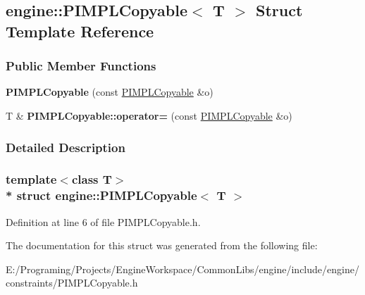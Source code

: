 \hypertarget{a00060}{}\subsection{engine\+:\+:P\+I\+M\+P\+L\+Copyable$<$ T $>$ Struct Template Reference}
\label{a00060}
\subsubsection*{Public Member Functions}
\begin{DoxyCompactItemize}
\item 
{\bfseries P\+I\+M\+P\+L\+Copyable} (const \hyperlink{a00060}{P\+I\+M\+P\+L\+Copyable} \&o)\hypertarget{a00060_af0ce03b894589b5bd951cc25a073dc65}{}\label{a00060_af0ce03b894589b5bd951cc25a073dc65}

\item 
T \& {\bfseries P\+I\+M\+P\+L\+Copyable\+::operator=} (const \hyperlink{a00060}{P\+I\+M\+P\+L\+Copyable} \&o)\hypertarget{a00060_a26fdb9b3d449d04dc653c7ae942f452b}{}\label{a00060_a26fdb9b3d449d04dc653c7ae942f452b}

\end{DoxyCompactItemize}


\subsubsection{Detailed Description}
\subsubsection*{template$<$class T$>$\\*
struct engine\+::\+P\+I\+M\+P\+L\+Copyable$<$ T $>$}



Definition at line 6 of file P\+I\+M\+P\+L\+Copyable.\+h.



The documentation for this struct was generated from the following file\+:\begin{DoxyCompactItemize}
\item 
E\+:/\+Programing/\+Projects/\+Engine\+Workspace/\+Common\+Libs/engine/include/engine/constraints/P\+I\+M\+P\+L\+Copyable.\+h\end{DoxyCompactItemize}
